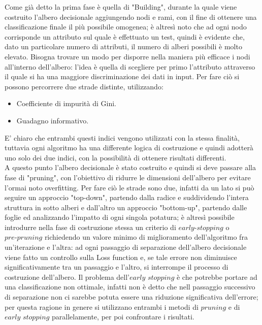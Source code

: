 Come già detto la prima fase è quella di "Building", durante la quale viene costruito l'albero decisionale aggiungendo nodi e rami, con il fine di ottenere una classificazione finale il più possibile omogenea; è altresì noto che ad ogni nodo corrisponde un attributo sul quale è effettuato un test, quindi è evidente che, dato un particolare numero di attributi, il numero di alberi possibili è molto elevato. Bisogna trovare un modo per disporre nella maniera più efficace i nodi all'interno dell'albero: l'idea è quella di scegliere per primo l'attributo attraverso il quale si ha una maggiore discriminazione dei dati in input. Per fare ciò si possono percorrere due strade distinte, utilizzando:
\begin{itemize}
	\item Coefficiente di impurità di Gini. 
	\item Guadagno informativo. 
\end{itemize} 
E' chiaro che entrambi questi indici vengono utilizzati con la stessa finalità, tuttavia ogni algoritmo ha una differente logica di costruzione e quindi adotterà uno solo dei due indici, con la possibilità di ottenere risultati differenti. \\
A questo punto l'albero decisionale è stato costruito e quindi si deve passare alla fase di "pruning", con l'obiettivo di ridurre le dimensioni dell'albero per evitare l'ormai noto overfitting. Per fare ciò le strade sono due, infatti da un lato si può seguire un approccio "top-down", partendo dalla radice e suddividendo l'intera struttura in sotto alberi e dall'altro un approccio "bottom-up", partendo dalle foglie ed analizzando l'impatto di ogni singola potatura; è altresì possibile introdurre nella fase di costruzione stessa un criterio di $\textit{early-stopping}$ o $\textit{pre-pruning}$ richiedendo un valore minimo di miglioramento dell'algoritmo fra un'iterazione e l'altra: ad ogni passaggio di separazione dell'albero decisionale viene fatto un controllo sulla Loss function e, se tale errore non diminuisce significativamente tra un passaggio e l'altro, si interrompe il processo di costruzione dell'albero. Il problema dell'$\textit{early stopping}$ è che potrebbe portare ad una classificazione non ottimale, infatti non è detto che nell passaggio successivo di separazione non ci sarebbe potuta essere una riduzione significativa dell'errore; per questa ragione in genere si utilizzano entrambi i metodi di $\textit{pruning}$ e di $\textit{early stopping}$ parallelamente, per poi confrontare i risultati. \\

